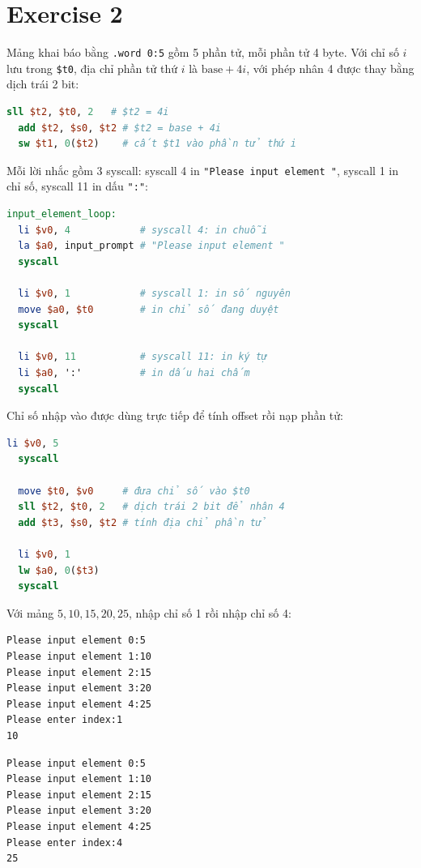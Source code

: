 \section{Exercise 2}

Mảng khai báo bằng \texttt{.word 0:5} gồm 5 phần tử, mỗi phần tử 4 byte. Với chỉ số $i$ lưu trong \texttt{\$t0}, địa chỉ phần tử thứ $i$ là $\text{base} + 4i$, với phép nhân 4 được thay bằng dịch trái 2 bit:

\begin{lstlisting}[language=MIPS,numbers=none]
  sll $t2, $t0, 2   # $t2 = 4i
  add $t2, $s0, $t2 # $t2 = base + 4i
  sw $t1, 0($t2)    # cất $t1 vào phần tử thứ i
\end{lstlisting}

Mỗi lời nhắc gồm 3 syscall: syscall 4 in \texttt{"Please input element "}, syscall 1 in chỉ số, syscall 11 in dấu \texttt{":"}:

\begin{lstlisting}[language=MIPS,numbers=none]
input_element_loop:
  li $v0, 4            # syscall 4: in chuỗi
  la $a0, input_prompt # "Please input element "
  syscall

  li $v0, 1            # syscall 1: in số nguyên
  move $a0, $t0        # in chỉ số đang duyệt
  syscall

  li $v0, 11           # syscall 11: in ký tự
  li $a0, ':'          # in dấu hai chấm
  syscall
\end{lstlisting}

Chỉ số nhập vào được dùng trực tiếp để tính offset rồi nạp phần tử:

\begin{lstlisting}[language=MIPS,numbers=none]
  li $v0, 5
  syscall

  move $t0, $v0     # đưa chỉ số vào $t0
  sll $t2, $t0, 2   # dịch trái 2 bit để nhân 4
  add $t3, $s0, $t2 # tính địa chỉ phần tử

  li $v0, 1
  lw $a0, 0($t3)
  syscall
\end{lstlisting}

Với mảng $5, 10, 15, 20, 25$, nhập chỉ số 1 rồi nhập chỉ số 4:

\begin{lstlisting}[language={},numbers=none]
Please input element 0:5
Please input element 1:10
Please input element 2:15
Please input element 3:20
Please input element 4:25
Please enter index:1
10
\end{lstlisting}

\begin{lstlisting}[language={},numbers=none]
Please input element 0:5
Please input element 1:10
Please input element 2:15
Please input element 3:20
Please input element 4:25
Please enter index:4
25
\end{lstlisting}

